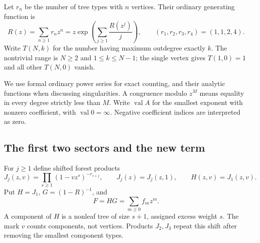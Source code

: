 \documentclass[11pt,letterpaper]{article}
\theoremstyle{definition}\newtheorem{definition}[theorem]{Definition}
\theoremstyle{remark}\newtheorem{remark}[theorem]{Remark}
\newcommand{\val}{\operatorname{val}}
\begin{document}
Let $r_n$ be the number of tree types with $n$ vertices. Their ordinary generating function is
\begin{equation}\label{hod:three:eq:R}
R(z)=\sum_{n\ge1}r_nz^n
=z\exp\!\left(\sum_{j\ge1}\frac{R(z^j)}j\right),
\qquad (r_1,r_2,r_3,r_4)=(1,1,2,4).
\end{equation}
Write $T(N,k)$ for the number having maximum outdegree exactly $k$. The nontrivial range is $N\ge2$ and $1\le k\le N-1$; the single vertex gives $T(1,0)=1$ and all other $T(N,0)$ vanish.

We use formal ordinary power series for exact counting, and their analytic functions when discussing singularities. A congruence modulo $z^M$ means equality in every degree strictly less than $M$. Write $\val A$ for the smallest exponent with nonzero coefficient, with $\val 0=\infty$. Negative coefficient indices are interpreted as zero.

\subsection{The first two sectors and the new term}
For $j\ge1$ define shifted forest products
\begin{equation}\label{hod:three:eq:J}
J_j(z,v)=\prod_{s\ge1}(1-vz^s)^{-r_{s+j}},\qquad
J_j(z)=J_j(z,1),\qquad H(z,v)=J_1(z,v).
\end{equation}
Put $H=J_1$, $G=(1-R)^{-1}$, and
\begin{equation}\label{hod:three:eq:F}
F=HG=\sum_{m\ge0}f_mz^m.
\end{equation}
A component of $H$ is a nonleaf tree of size $s+1$, assigned excess weight $s$. The mark $v$ counts components, not vertices. Products $J_2,J_3$ repeat this shift after removing the smallest component types.
\end{document}

